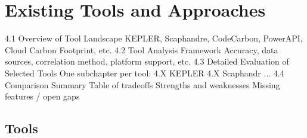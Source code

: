 \chapter{Existing Tools and Approaches} %
\label{Chapter4}


    4.1 Overview of Tool Landscape
        KEPLER, Scaphandre, CodeCarbon, PowerAPI, Cloud Carbon Footprint, etc.
    4.2 Tool Analysis Framework
        Accuracy, data sources, correlation method, platform support, etc.
    4.3 Detailed Evaluation of Selected Tools
        One subchapter per tool:
            4.X KEPLER
            4.X Scaphandr
            ...
    4.4 Comparison Summary
        Table of tradeoffs
        Strengths and weaknesses
        Missing features / open gaps


\section{Tools}
